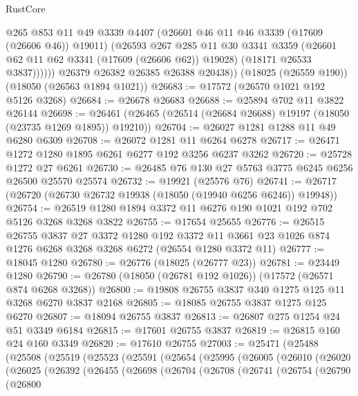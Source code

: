 \begin{lexlean}{RustCore}
\begin{coremodule}
                @265
                @853
                @11
                @49
                @3339
                @4407
                (@26601 @46 @11 @46 @3339 (@17609 (@26606 @46)) @19011)
                (@26593
                  @267
                  @285
                  @11
                  @30
                  @3341
                  @3359
                  (@26601 @62 @11 @62 @3341 (@17609 (@26606 @62)) @19028)
                  (@18171 @26533 @3837))))))
        @26379
        @26382
        @26385
        @26388
        @20438))
    (@18025 (@26559 @190))
    (@18050 (@26563 @1894 @1021))
@26683 := @17572 (@26570 @1021 @192 @5126 @3268)
@26684 := @26678 @26683
@26688 := @25894 @702 @11 @3822 @26144
@26698 := @26461 (@26465 (@26514 (@26684 @26688) @19197 (@18050 (@23735 @1269 @1895)) @19210))
@26704 := @26027 @1281 @1288 @11 @49 @6280 @6309
@26708 := @26072 @1281 @11 @6264 @6278
@26717 := @26471 @1272 @1280 @1895 @6261 @6277 @192 @3256 @6237 @3262
@26720 := @25728 @1272 @27 @6261
@26730 := @26485 @76 @130 @27 @5763 @3775 @6245 @6256 @26500 @25570 @25574
@26732 := @19921 (@25576 @76)
@26741 := @26717 (@26720 (@26730 @26732 @19938 (@18050 (@19940 @6256 @6246)) @19948))
@26754 := @26519 @1280 @1894 @3372 @11 @6276 @190 @1021 @192 @702 @5126 @3268 @3268 @3822
@26755 := @17654 @25655
@26776 := @26515
    @26755
    @3837
    @27
    @3372
    @1280
    @192
    @3372
    @11
    @3661
    @23
    @1026
    @874
    @1276
    @6268
    @3268
    @3268
    @6272
    (@26554 @1280 @3372 @11)
@26777 := @18045 @1280
@26780 := @26776 (@18025 (@26777 @23))
@26781 := @23449 @1280
@26790 := @26780 (@18050 (@26781 @192 @1026)) (@17572 (@26571 @874 @6268 @3268))
@26800 := @19808 @26755 @3837 @340 @1275 @125 @11 @3268 @6270 @3837 @2168
@26805 := @18085 @26755 @3837 @1275 @125 @6270
@26807 := @18094 @26755 @3837
@26813 := @26807 @275 @1254 @24 @51 @3349 @6184
@26815 := @17601 @26755 @3837
@26819 := @26815 @160 @24 @160 @3349
@26820 := @17610 @26755
@27003 := @25471
    (@25488
      (@25508
        (@25519
          (@25523
            (@25591
              (@25654
                (@25995
                  (@26005
                    (@26010
                      (@26020
                        (@26025
                          (@26392
                            (@26455
                              (@26698
                                (@26704
                                  (@26708
                                    (@26741
                                      (@26754
                                        (@26790
                                          (@26800

\end{coremodule}
\end{lexlean}
